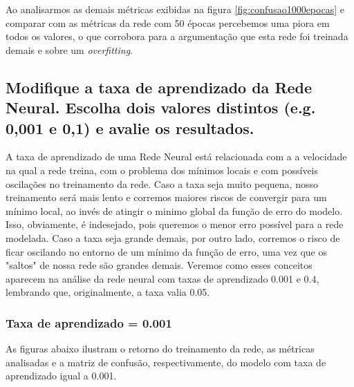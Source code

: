 \documentclass[12pt]{article}
\begin{document}
Ao analisarmos as demais métricas exibidas na figura \ref{fig:confusao1000epocas} e comparar com as métricas da rede com 50 épocas percebemos uma piora em todos os valores, o que corrobora para a argumentação que esta rede foi treinada demais e sobre um \textit{overfitting}.

\subsection{Modifique a taxa de aprendizado da Rede Neural. Escolha dois valores distintos (e.g. 0,001 e 0,1) e avalie os resultados.}

A taxa de aprendizado de uma Rede Neural está relacionada com a a velocidade na qual a rede treina, com o problema dos mínimos locais e com possíveis oscilações no treinamento da rede. Caso a taxa seja muito pequena, nosso treinamento será mais lento e corremos maiores riscos de convergir para um mínimo local, ao invés de atingir o minimo global da função de erro do modelo. Isso, obviamente, é indesejado, pois queremos o menor erro possível para a rede modelada. Caso a taxa seja grande demais, por outro lado, corremos o risco de ficar oscilando no entorno de um mínimo da função de erro, uma vez que os "saltos" de nossa rede são grandes demais. Veremos como esses conceitos aparecem na análise da rede neural com taxas de aprendizado 0.001 e 0.4, lembrando que, originalmente, a taxa valia 0.05. 

\subsubsection{Taxa de aprendizado = 0.001}

As figuras abaixo ilustram o retorno do treinamento da rede, as métricas analisadas e a matriz de confusão, respectivamente, do modelo com taxa de aprendizado igual a 0.001. 
\end{document}
